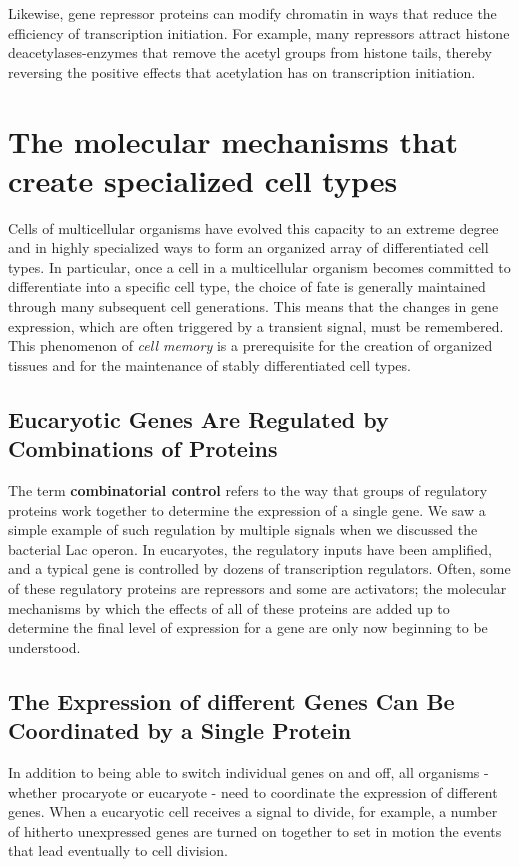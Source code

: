 Likewise, gene repressor proteins can modify chromatin in ways that
reduce the efficiency of transcription initiation. For example, many repressors
attract histone deacetylases-enzymes that remove the acetyl groups
from histone tails, thereby reversing the positive effects that acetylation
has on transcription initiation.

\section{The molecular mechanisms that create specialized cell types}

Cells of multicellular organisms have evolved
this capacity to an extreme degree and in highly specialized ways to form
an organized array of differentiated cell types. In particular, once a cell in a
multicellular organism becomes committed to differentiate into a specific
cell type, the choice of fate is generally maintained through many subsequent
cell generations. This means that the changes in gene expression,
which are often triggered by a transient signal, must be remembered. This
phenomenon of \textit{cell memory} is a prerequisite for the creation of organized
tissues and for the maintenance of stably differentiated cell types.

\subsection{Eucaryotic Genes Are Regulated by Combinations of Proteins}

The term \textbf{combinatorial control} refers to the way that groups of regulatory
proteins work together to determine the expression of a single gene.
We saw a simple example of such regulation by multiple signals when
we discussed the bacterial Lac operon. In eucaryotes, the
regulatory inputs have been amplified, and a typical gene is controlled
by dozens of transcription regulators. Often, some of these
regulatory proteins are repressors and some are activators; the molecular
mechanisms by which the effects of all of these proteins are added up to
determine the final level of expression for a gene are only now beginning
to be understood.

\subsection{The Expression of different Genes Can Be Coordinated by a Single Protein}

In addition to being able to switch individual genes on and off, all
organisms - whether procaryote or eucaryote - need to coordinate the
expression of different genes. When a eucaryotic cell receives a signal to
divide, for example, a number of hitherto unexpressed genes are turned
on together to set in motion the events that lead eventually to cell division.

